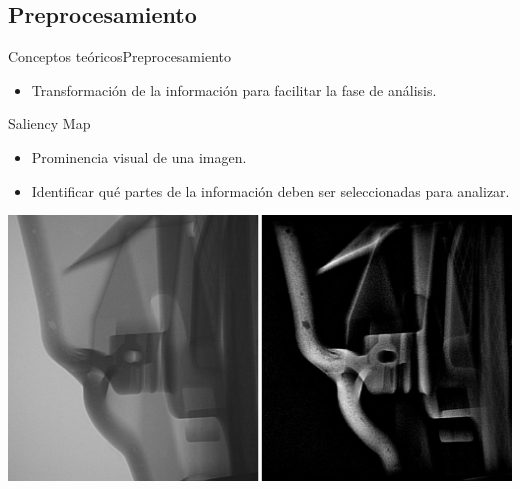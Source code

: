 \documentclass[10pt]{beamer}
\begin{document}
\subsection{Preprocesamiento}
\begin{frame}{Conceptos teóricos}{Preprocesamiento}

\begin{itemize}
\item Transformación de la información para facilitar la fase de análisis.
\end{itemize}

\pause

\begin{block}{Saliency Map}

\begin{itemize}
\item Prominencia visual de una imagen.
\item Identificar qué partes de la información deben ser seleccionadas para analizar.
\end{itemize}

{\centering \includegraphics[scale=0.2]{AAUgraphics/saliency.png}\par}

\end{block}

\end{frame}
\end{document}
